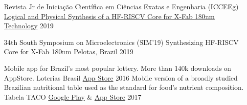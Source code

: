 
\begin{cventries}


    \cvcompactentry
    { Revista Jr de Iniciação Científica em Ciências Exatas e Engenharia (ICCEEg)}
    {\href{http://download.c3.furg.br/components/download_categoria/baixar.php?arquivo=e4873aa9a05cc5ed839561d121516766}{Logical and Physical Synthesis of a HF-RISCV Core for X-Fab 180nm Technology}}
    {}
    {2019}

  \cvcompactentry
    {34th South Symposium on Microelectronics (SIM'19)}
    {Synthesizing HF-RISCV Core for X-Fab 180nm}
    {Pelotas, Brazil}
    {2019}
\end{cventries}


\begin{cventries}



  \cvcompactentry
    {Mobile app for Brazil’s most popular lottery. More than 140k downloads on AppStore.}
    {Loterias Brasil}
    {\href{https://apps.apple.com/app/id992505562}{App Store}}
    {2016}
  \cvcompactentry
    {Mobile version of a broadly studied Brazilian nutritional table used as the standard for food’s nutrient composition.}
    {Tabela TACO}
    {\href{https://play.google.com/store/apps/details?id=rodrigo.TabelaTaco&hl=pt_BR&gl=US}{Google Play} \& \href{https://apps.apple.com/app/id1066079092}{App Store} }
    {2017}

\end{cventries}
